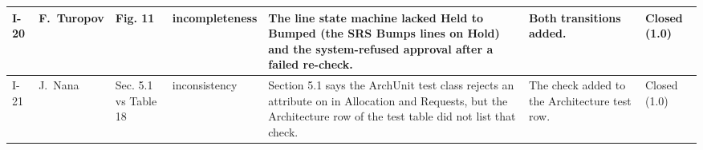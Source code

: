 {\begin{longtable}{@{}L{0.7cm}L{1.5cm}L{2.5cm}L{1.6cm}L{4.3cm}L{3.9cm}L{1.3cm}@{}}
I-20 & F.~Turopov & Fig. 11 & incompleteness & The line state machine lacked Held to Bumped (the SRS Bumps lines on Hold) and the system-refused approval after a failed re-check. & Both transitions added. & Closed (1.0) \\ \midrule
I-21 & J.~Nana & Sec. 5.1 vs Table 18 & inconsistency & Section 5.1 says the ArchUnit test class rejects an  attribute on  in Allocation and Requests, but the Architecture row of the test table did not list that check. & The check added to the Architecture test row. & Closed (1.0) \\
\end{longtable}
}
